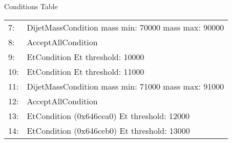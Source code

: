 \documentclass{beamer}
\begin{document}
\begin{frame}[fragile=singleslide]
\begin{minipage}[t]{0.58\linewidth}
\begin{block}{Conditions Table}
\begin{tiny}
\begin{tabular}{ll}
  7: & DijetMassCondition mass min: 70000 mass max: 90000 \\
  8: & AcceptAllCondition\\
  9: & EtCondition Et threshold: 10000 \\
 10: & EtCondition Et threshold: 11000 \\
 11: & DijetMassCondition mass min: 71000 mass max: 91000\\
 12: & AcceptAllCondition\\
 13: & EtCondition (0x646cea0)  Et threshold: 12000 \\
 14: & EtCondition (0x646ceb0)  Et threshold: 13000 \\
\end{tabular}
\end{tiny}
\end{block}
\end{minipage}
\end{frame}
\end{document}
